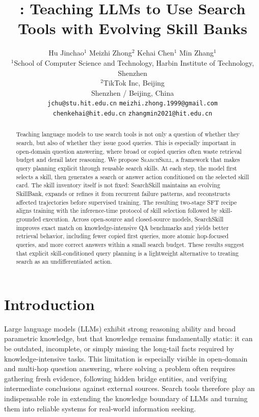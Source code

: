 \documentclass{article}
\title{\Ours: Teaching LLMs to Use Search Tools with Evolving Skill Banks}
\author{%
Hu Jinchao$^{1}$ \quad Meizhi Zhong$^{2}$ \quad Kehai Chen$^{1}$ \quad Min Zhang$^{1}$\\
$^{1}$School of Computer Science and Technology, Harbin Institute of Technology, Shenzhen\\
$^{2}$TikTok Inc, Beijing\\
Shenzhen / Beijing, China\\
\texttt{jchu@stu.hit.edu.cn} \quad
\texttt{meizhi.zhong.1999@gmail.com}\\
\texttt{chenkehai@hit.edu.cn} \quad
\texttt{zhangmin2021@hit.edu.cn}
}
\newcommand{\Ours}{\textsc{SearchSkill}\xspace}
\begin{document}
\maketitle

\begin{abstract}
  Teaching language models to use search tools is not only a question of whether they search, but also of whether they issue good queries. This is especially important in open-domain question answering, where broad or copied queries often waste retrieval budget and derail later reasoning. We propose \Ours, a framework that makes query planning explicit through reusable search skills. At each step, the model first selects a skill, then generates a search or answer action conditioned on the selected skill card. The skill inventory itself is not fixed: SearchSkill maintains an evolving SkillBank, expands or refines it from recurrent failure patterns, and reconstructs affected trajectories before supervised training. The resulting two-stage SFT recipe aligns training with the inference-time protocol of skill selection followed by skill-grounded execution. Across open-source and closed-source models, SearchSkill improves exact match on knowledge-intensive QA benchmarks and yields better retrieval behavior, including fewer copied first queries, more atomic hop-focused queries, and more correct answers within a small search budget. These results suggest that explicit skill-conditioned query planning is a lightweight alternative to treating search as an undifferentiated action.
\end{abstract}

\section{Introduction}
Large language models (LLMs) exhibit strong reasoning ability and broad parametric knowledge, but that knowledge remains fundamentally static: it can be outdated, incomplete, or simply missing the long-tail facts required by knowledge-intensive tasks. This limitation is especially visible in open-domain and multi-hop question answering, where solving a problem often requires gathering fresh evidence, following hidden bridge entities, and verifying intermediate conclusions against external sources. Search tools therefore play an indispensable role in extending the knowledge boundary of LLMs and turning them into reliable systems for real-world information seeking.
\end{document}
